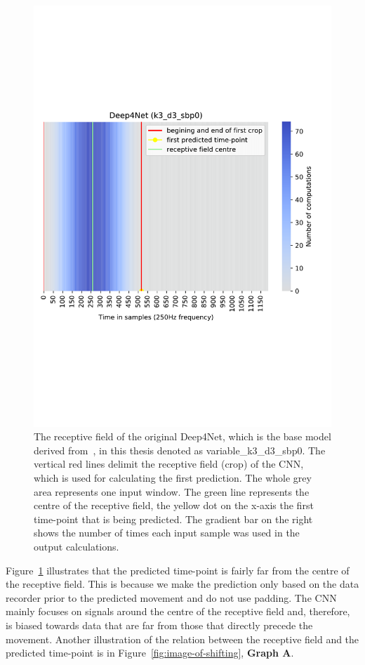 \begin{figure}[!htbp]
\centering
\includegraphics[width=0.8\linewidth]{img/ch3/deep4net-receptive-field}
\caption[Receptive field]{The receptive field of the original Deep4Net, which is the base model derived from~\cite{Hammer-2021}, in this thesis denoted as {variable}\_k3\_d3\_sbp0.
The vertical red lines delimit the receptive field (crop) of the CNN, which is used for calculating the first prediction.
The whole grey area represents one input window.
The green line represents the centre of the receptive field, the yellow dot on the x-axis the first time-point that is being predicted.
The gradient bar on the right shows the number of times each input sample was used in the output calculations.}
\label{fig:receptive-field}
\end{figure}

Figure~\ref{fig:receptive-field} illustrates that the predicted time-point is fairly far from the centre of the receptive field.
This is because we make the prediction only based on the data recorder prior to the predicted movement and do not use padding.
The CNN mainly focuses on signals around the centre of the receptive field and, therefore, is biased towards data that are far from those that directly precede the movement.
Another illustration of the relation between the receptive field and the predicted time-point is in Figure~\ref{fig:image-of-shifting}, \textbf{Graph A}.

